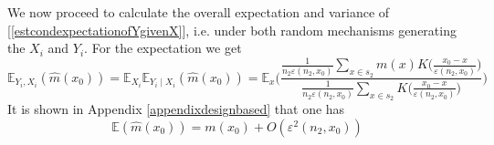\documentclass[a4paper,12pt,leqno, titlepage]{article}
\newcommand{\EX}{\mathbb{E}}
\begin{document}
\begin{appendix}
We now proceed to calculate the overall expectation and variance of [\ref{estcondexpectationofYgivenX}], i.e. under both random mechanisms generating the $X_i$ and $Y_i$. For the expectation we get
\begin{equation}\label{overallexpectation1}
\EX_{Y_i,X_i}(\hat{m}(x_0))=\EX_{X_i}\EX_{Y_i\mid X_i}(\hat{m}(x_0))=\EX_x\Big(\frac{\frac{1}{n_2\varepsilon(n_2,x_0)}\sum_{x\in{s_2}}m(x)K\big(\frac{x_0-x}{\varepsilon(n_2,x_0)}\big)}
{\frac{1}{n_2\varepsilon(n_2,x_0)}\sum_{x\in{s_2}}K\big(\frac{x_0-x}{\varepsilon(n_2,x_0)}\big)}\Big)
\end{equation}
It is shown in Appendix \ref{appendixdesignbased} that one has
\begin{equation}\label{overallexpectation2}
\EX(\hat{m}(x_0))=m(x_0)+O(\varepsilon^2(n_2,x_0))
\end{equation}


\end{appendix}
\end{document}

